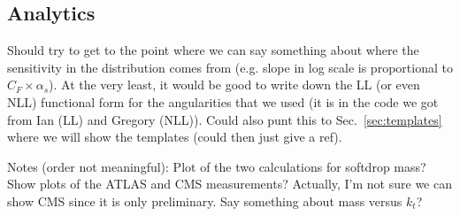 
\subsection{Analytics}


Should try to get to the point where we can say something about where the sensitivity in the distribution comes from (e.g. slope in log scale is proportional to $C_F\times \alpha_s$).  At the very least, it would be good to write down the LL (or even NLL) functional form for the angularities that we used (it is in the code we got from Ian (LL) and Gregory (NLL)).  Could also punt this to Sec.~\ref{sec:templates} where we will show the templates (could then just give a ref).

Notes (order not meaningful): Plot of the two calculations for softdrop mass?  Show plots of the ATLAS and CMS measurements?  Actually, I'm not sure we can show CMS since it is only preliminary.  Say something about mass versus $k_t$?

